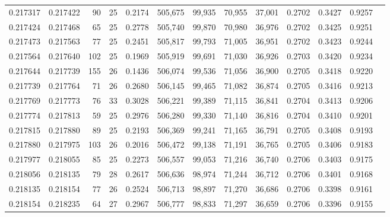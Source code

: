 \begin{tabular}{rrrrrrrrrrrrr}
0.217317 & 0.217422 &  90 &  25 &                                     0.2174 & 505,675 &  99,935 &  70,955 &  37,001 & 0.2702 & 0.3427 & 0.9257 \\
0.217424 & 0.217468 &  65 &  25 &                                     0.2778 & 505,740 &  99,870 &  70,980 &  36,976 & 0.2702 & 0.3425 & 0.9251 \\
0.217473 & 0.217563 &  77 &  25 &                                     0.2451 & 505,817 &  99,793 &  71,005 &  36,951 & 0.2702 & 0.3423 & 0.9244 \\
0.217564 & 0.217640 & 102 &  25 &                                     0.1969 & 505,919 &  99,691 &  71,030 &  36,926 & 0.2703 & 0.3420 & 0.9234 \\
0.217644 & 0.217739 & 155 &  26 &                                     0.1436 & 506,074 &  99,536 &  71,056 &  36,900 & 0.2705 & 0.3418 & 0.9220 \\
0.217739 & 0.217764 &  71 &  26 &                                     0.2680 & 506,145 &  99,465 &  71,082 &  36,874 & 0.2705 & 0.3416 & 0.9213 \\
0.217769 & 0.217773 &  76 &  33 &                                     0.3028 & 506,221 &  99,389 &  71,115 &  36,841 & 0.2704 & 0.3413 & 0.9206 \\
0.217774 & 0.217813 &  59 &  25 &                                     0.2976 & 506,280 &  99,330 &  71,140 &  36,816 & 0.2704 & 0.3410 & 0.9201 \\
0.217815 & 0.217880 &  89 &  25 &                                     0.2193 & 506,369 &  99,241 &  71,165 &  36,791 & 0.2705 & 0.3408 & 0.9193 \\
0.217880 & 0.217975 & 103 &  26 &                                     0.2016 & 506,472 &  99,138 &  71,191 &  36,765 & 0.2705 & 0.3406 & 0.9183 \\
0.217977 & 0.218055 &  85 &  25 &                                     0.2273 & 506,557 &  99,053 &  71,216 &  36,740 & 0.2706 & 0.3403 & 0.9175 \\
0.218056 & 0.218135 &  79 &  28 &                                     0.2617 & 506,636 &  98,974 &  71,244 &  36,712 & 0.2706 & 0.3401 & 0.9168 \\
0.218135 & 0.218154 &  77 &  26 &                                     0.2524 & 506,713 &  98,897 &  71,270 &  36,686 & 0.2706 & 0.3398 & 0.9161 \\
0.218154 & 0.218235 &  64 &  27 &                                     0.2967 & 506,777 &  98,833 &  71,297 &  36,659 & 0.2706 & 0.3396 & 0.9155 \\

\end{tabular}
